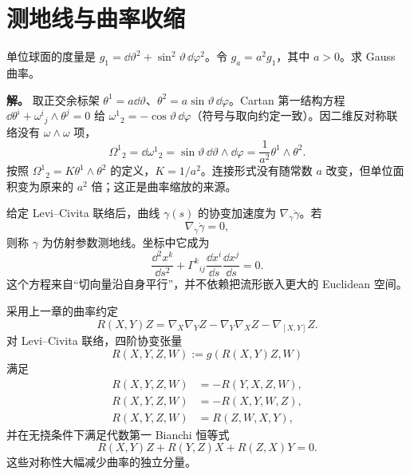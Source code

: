 \section{测地线与曲率收缩}

\begin{workedexample}[球面曲率在整体缩放下怎样变化]
单位球面的度量是 \(g_1=\dd\vartheta^2+\sin^2\vartheta\,\dd\varphi^2\)。令 \(g_a=a^2g_1\)，其中 \(a>0\)。求 Gauss 曲率。

\textbf{解。} 取正交余标架 \(\theta^1=a\dd\vartheta\)、\(\theta^2=a\sin\vartheta\,\dd\varphi\)。Cartan 第一结构方程 \(\dd\theta^i+\omega^i{}_j\wedge\theta^j=0\) 给 \(\omega^1{}_2=-\cos\vartheta\,\dd\varphi\)（符号与取向约定一致）。因二维反对称联络没有 \(\omega\wedge\omega\) 项，
\[
\Omega^1{}_2=\dd\omega^1{}_2
=\sin\vartheta\,\dd\vartheta\wedge\dd\varphi
=\frac1{a^2}\theta^1\wedge\theta^2.
\]
按照 \(\Omega^1{}_2=K\theta^1\wedge\theta^2\) 的定义，\(K=1/a^2\)。连接形式没有随常数 \(a\) 改变，但单位面积变为原来的 \(a^2\) 倍；这正是曲率缩放的来源。
\end{workedexample}


给定 Levi--Civita 联络后，曲线 $\gamma(s)$ 的协变加速度为 $\nabla_{\dot\gamma}\dot\gamma$。若
\begin{equation*}\nabla_{\dot\gamma}\dot\gamma=0,
\end{equation*}
则称 $\gamma$ 为仿射参数测地线。坐标中它成为
\[
\frac{\dd^2x^k}{\dd s^2}
+\Gamma^k{}_{ij}
\frac{\dd x^i}{\dd s}
\frac{\dd x^j}{\dd s}=0.
\]
这个方程来自“切向量沿自身平行”，并不依赖把流形嵌入更大的 Euclidean 空间。

采用上一章的曲率约定
\[
R(X,Y)Z
=\nabla_X\nabla_YZ-\nabla_Y\nabla_XZ-\nabla_{[X,Y]}Z.
\]
对 Levi--Civita 联络，四阶协变张量
\[
R(X,Y,Z,W):=g(R(X,Y)Z,W)
\]
满足
\begin{align*}
R(X,Y,Z,W)&=-R(Y,X,Z,W),\\
R(X,Y,Z,W)&=-R(X,Y,W,Z),\\
R(X,Y,Z,W)&=R(Z,W,X,Y),
\end{align*}
并在无挠条件下满足代数第一 Bianchi 恒等式
\[
R(X,Y)Z+R(Y,Z)X+R(Z,X)Y=0.
\]
这些对称性大幅减少曲率的独立分量。

